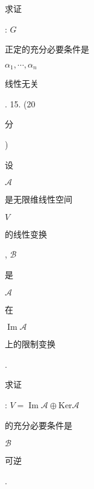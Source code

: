 \documentclass[10pt]{article}
\begin{document}
\begin{CJK}{UTF8}{mj}求证\end{CJK}: $G$ \begin{CJK}{UTF8}{mj}正定的充分必要条件是\end{CJK} $\alpha_{1}, \cdots, \alpha_{n}$ \begin{CJK}{UTF8}{mj}线性无关\end{CJK}. 15. (20 \begin{CJK}{UTF8}{mj}分\end{CJK}) \begin{CJK}{UTF8}{mj}设\end{CJK} $\mathscr{A}$ \begin{CJK}{UTF8}{mj}是无限维线性空间\end{CJK} $V$ \begin{CJK}{UTF8}{mj}的线性变换\end{CJK}, $\mathscr{B}$ \begin{CJK}{UTF8}{mj}是\end{CJK} $\mathscr{A}$ \begin{CJK}{UTF8}{mj}在\end{CJK} $\operatorname{Im} \mathscr{A}$ \begin{CJK}{UTF8}{mj}上的限制变换\end{CJK}. \begin{CJK}{UTF8}{mj}求证\end{CJK}: $V=\operatorname{Im} \mathscr{A} \oplus \mathrm{Ker} \mathscr{A}$ \begin{CJK}{UTF8}{mj}的充分必要条件是\end{CJK} $\mathscr{B}$ \begin{CJK}{UTF8}{mj}可逆\end{CJK}.
\end{document}
